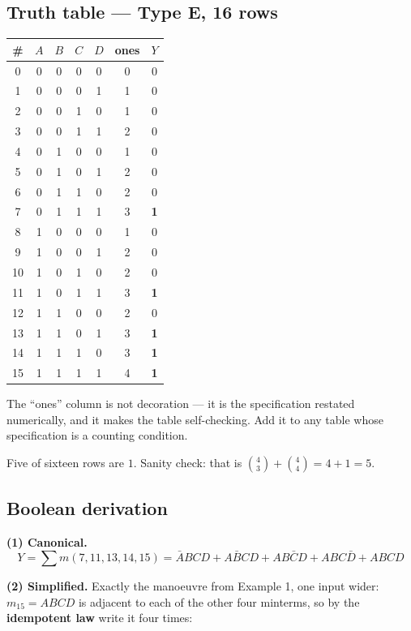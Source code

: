 \documentclass[11pt]{article}
\begin{document}
\subsection*{Truth table --- Type E, 16 rows}

\begin{center}
\begin{tabular}{c|cccc|c|c}
\toprule
\# & $A$ & $B$ & $C$ & $D$ & ones & $Y$ \\
\midrule
0  & 0&0&0&0 & 0 & 0 \\
1  & 0&0&0&1 & 1 & 0 \\
2  & 0&0&1&0 & 1 & 0 \\
3  & 0&0&1&1 & 2 & 0 \\
4  & 0&1&0&0 & 1 & 0 \\
5  & 0&1&0&1 & 2 & 0 \\
6  & 0&1&1&0 & 2 & 0 \\
7  & 0&1&1&1 & 3 & \textbf{1} \\
8  & 1&0&0&0 & 1 & 0 \\
9  & 1&0&0&1 & 2 & 0 \\
10 & 1&0&1&0 & 2 & 0 \\
11 & 1&0&1&1 & 3 & \textbf{1} \\
12 & 1&1&0&0 & 2 & 0 \\
13 & 1&1&0&1 & 3 & \textbf{1} \\
14 & 1&1&1&0 & 3 & \textbf{1} \\
15 & 1&1&1&1 & 4 & \textbf{1} \\
\bottomrule
\end{tabular}
\end{center}

The ``ones'' column is not decoration --- it is the specification restated
numerically, and it makes the table self-checking. Add it to any table whose
specification is a counting condition.

Five of sixteen rows are $1$. Sanity check: that is $\binom{4}{3} + \binom{4}{4}
= 4 + 1 = 5$. \checkmark

\subsection*{Boolean derivation}

\textbf{(1) Canonical.}
\[
Y = \sum m(7,11,13,14,15) = \bar{A}BCD + A\bar{B}CD + AB\bar{C}D + ABC\bar{D} + ABCD
\]

\textbf{(2) Simplified.} Exactly the manoeuvre from Example 1, one input wider:
$m_{15} = ABCD$ is adjacent to each of the other four minterms, so by the
\textbf{idempotent law} write it four times:
\end{document}
